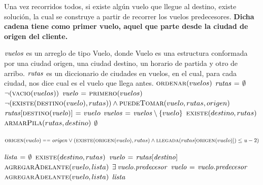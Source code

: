 Una vez recorridos todos, si existe algún vuelo que llegue al destino, existe
solución, la cual se construye a partir de recorrer los vuelos predecesores.
\textbf{Dicha cadena tiene como primer vuelo, aquel que parte desde la ciudad
de origen del cliente.}


\begin{codebox}
\li \Comment $\id{vuelos}$ es un arreglo de tipo Vuelo, donde Vuelo es una
\li \Comment estructura conformada por una ciudad origen, una ciudad destino,
\li \Comment un horario de partida y otro de arribo.
\li
\li \Comment $\id{rutas}$ es un diccionario de ciudades en vuelos, en el cual,
\li \Comment para cada ciudad, nos dice cual es el vuelo que llega antes.
\li $\textnormal{\scshape ordenar}(vuelos)$
\li $\id{rutas} \gets \emptyset$
\li \While $\neg (\textnormal{\scshape vacio}(vuelos))$
\li     \Do
            $\id{vuelo} \gets \proc{primero}(vuelos)$
\li         \If $\neg (\textnormal{\scshape existe}(\textnormal{\scshape destino}(vuelo),rutas)) \land
                \textnormal{\scshape puedeTomar}(vuelo,rutas,origen)$
\li             \Then
                    $\id{rutas[\proc{destino}(vuelo)]} \gets vuelo$
                \End
\li         $\id{vuelos} \gets \id{vuelos} \setminus \{vuelo\}$
        \End
\li \If $\textnormal{\scshape existe}(destino,rutas)$
\li     \Then
            \Return $\textnormal{\scshape armarPila}(rutas,destino)$
\li     \Else
\li         \Return $\emptyset$
        \End
\end{codebox}


\vspace*{0.3cm}


\begin{codebox}
\li \Return $\proc{origen}(vuelo) \isequal \id{origen} \lor
            (\proc{existe}(\proc{origen}(vuelo),rutas) \land
             \proc{llegada}(rutas[\proc{origen}(vuelo)]) \leq
             \id{u} - 2)$
\end{codebox}


\vspace*{0.3cm}


\begin{codebox}
\li $\id{lista} \gets \emptyset$
\li \If $\textnormal{\scshape existe}(destino,rutas)$
\li     \Then
            $\id{vuelo} \gets \id{rutas[destino]}$
\li         $\textnormal{\scshape agregarAdelante}(vuelo,lista)$
\li         \While $\exists \hspace{0.07cm} \id{vuelo.predecesor}$
\li             \Do
                   $\id{vuelo} \gets \id{vuelo.predecesor}$
\li                $\textnormal{\scshape agregarAdelante}(vuelo,lista)$
                \End
\li     \Else
\li         \Return $\id{lista}$
        \End
\end{codebox}




